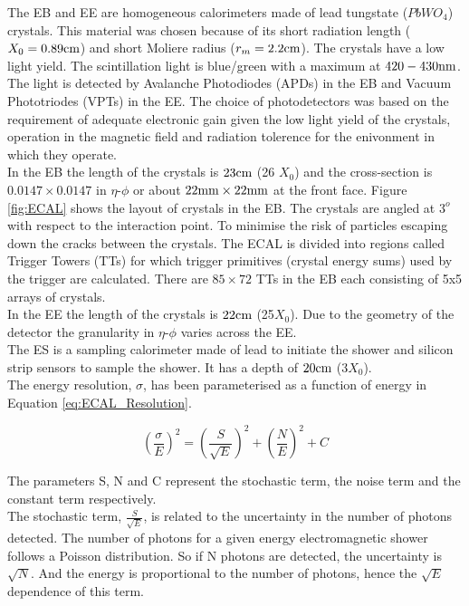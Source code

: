 The EB and EE are homogeneous calorimeters made of lead tungstate ($PbWO_{4}$)
crystals. This material was chosen because of its short radiation length ($X_{0}
= 0.89\mbox{cm}$) and short Moliere radius ($r_{m} = 2.2\mbox{cm}$). The crystals have a low
light yield. The scintillation light is blue/green with a maximum at 
$420-430\mbox{nm}$. The light is detected by Avalanche Photodiodes (APDs) in the EB 
and Vacuum Phototriodes (VPTs) in the EE. The choice of photodetectors was based
on the requirement of adequate electronic gain given the low light yield of the 
crystals, operation in the magnetic field and radiation tolerence for the 
enivonment in which they operate. \\

In the EB the length of the crystals is $23\mbox{cm}$ (26 $X_{0}$) and the 
cross-section is $0.0147\times0.0147$ in $\eta$-$\phi$ or about 
$22\mbox{mm}\times22\mbox{mm}$ at the front face. Figure \ref{fig:ECAL} shows the layout 
of crystals in the EB. The crystals are angled at $3^{o}$ with respect to the 
interaction point. To minimise the risk of particles escaping down the cracks 
between the crystals. The ECAL is divided into regions called Trigger Towers 
(TTs) for which trigger primitives (crystal energy sums) used by the trigger 
are calculated. There are $85\times72$ TTs in the EB each consisting of 5x5 
arrays of crystals. \\

In the EE the length of the crystals is $22\mbox{cm}$ (25$X_{0}$). Due to the geometry
of the detector the granularity in $\eta$-$\phi$ varies across the EE. \\

The ES is a sampling calorimeter made of lead to initiate the shower and
silicon strip sensors to sample the shower. It has a depth of $20\mbox{cm}$ 
($3X_{0}$). \\

The energy resolution, $\sigma$, has been parameterised as a function of energy 
in Equation \ref{eq:ECAL_Resolution}. 

\begin{equation}
\left( \frac{\sigma}{E} \right)^{2} = \left( \frac{S}{\sqrt{E}} \right)^{2} +
\left( \frac{N}{E} \right)^{2} + C
\label{eq:ECAL_Resolution}
\end{equation}

The parameters S, N and C represent the stochastic term, the noise term and the
constant term respectively. \\

The stochastic term, $\frac{S}{\sqrt{E}}$, is related to the uncertainty in the 
number of photons detected. The number of photons for a given energy 
electromagnetic shower follows a Poisson distribution. So if N photons are 
detected, the uncertainty is $\sqrt{N}$. And the energy is proportional to the 
number of photons, hence the $\sqrt{E}$ dependence of this term. \\

